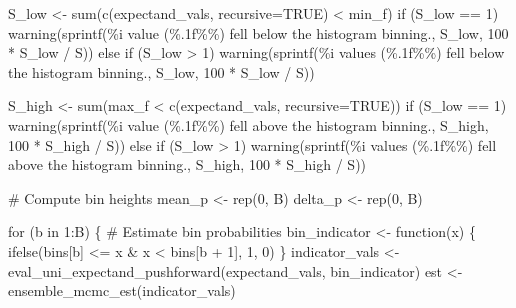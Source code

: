 \documentclass[
  letterpaper,
  DIV=11,
  numbers=noendperiod]{scrartcl}
\newenvironment{Shaded}{\begin{snugshade}}{\end{snugshade}}
\newcommand{\BuiltInTok}[1]{\textcolor[rgb]{0.00,0.23,0.31}{#1}}
\newcommand{\CommentTok}[1]{\textcolor[rgb]{0.37,0.37,0.37}{#1}}
\newcommand{\ControlFlowTok}[1]{\textcolor[rgb]{0.00,0.23,0.31}{#1}}
\newcommand{\DecValTok}[1]{\textcolor[rgb]{0.68,0.00,0.00}{#1}}
\newcommand{\KeywordTok}[1]{\textcolor[rgb]{0.00,0.23,0.31}{#1}}
\newcommand{\NormalTok}[1]{\textcolor[rgb]{0.00,0.23,0.31}{#1}}
\newcommand{\OperatorTok}[1]{\textcolor[rgb]{0.37,0.37,0.37}{#1}}
\newcommand{\SpecialCharTok}[1]{\textcolor[rgb]{0.37,0.37,0.37}{#1}}
\newcommand{\StringTok}[1]{\textcolor[rgb]{0.13,0.47,0.30}{#1}}
\begin{document}
\begin{Shaded}
\begin{Highlighting}[]
\NormalTok{  S\_low }\OperatorTok{\textless{}{-}} \BuiltInTok{sum}\NormalTok{(c(expectand\_vals, recursive}\OperatorTok{=}\NormalTok{TRUE) }\OperatorTok{\textless{}}\NormalTok{ min\_f)}
  \ControlFlowTok{if}\NormalTok{ (S\_low }\OperatorTok{==} \DecValTok{1}\NormalTok{)}
\NormalTok{    warning(sprintf(}\StringTok{\textquotesingle{}}\SpecialCharTok{\%i}\StringTok{ value (}\SpecialCharTok{\%.1f\%\%}\StringTok{) fell below the histogram binning.\textquotesingle{}}\NormalTok{,}
\NormalTok{                    S\_low, }\DecValTok{100} \OperatorTok{*}\NormalTok{ S\_low }\OperatorTok{/}\NormalTok{ S))}
  \ControlFlowTok{else} \ControlFlowTok{if}\NormalTok{ (S\_low }\OperatorTok{\textgreater{}} \DecValTok{1}\NormalTok{)}
\NormalTok{    warning(sprintf(}\StringTok{\textquotesingle{}}\SpecialCharTok{\%i}\StringTok{ values (}\SpecialCharTok{\%.1f\%\%}\StringTok{) fell below the histogram binning.\textquotesingle{}}\NormalTok{,}
\NormalTok{                    S\_low, }\DecValTok{100} \OperatorTok{*}\NormalTok{ S\_low }\OperatorTok{/}\NormalTok{ S))}

\NormalTok{  S\_high }\OperatorTok{\textless{}{-}} \BuiltInTok{sum}\NormalTok{(max\_f }\OperatorTok{\textless{}}\NormalTok{ c(expectand\_vals, recursive}\OperatorTok{=}\NormalTok{TRUE))}
  \ControlFlowTok{if}\NormalTok{ (S\_low }\OperatorTok{==} \DecValTok{1}\NormalTok{)}
\NormalTok{    warning(sprintf(}\StringTok{\textquotesingle{}}\SpecialCharTok{\%i}\StringTok{ value (}\SpecialCharTok{\%.1f\%\%}\StringTok{) fell above the histogram binning.\textquotesingle{}}\NormalTok{,}
\NormalTok{                    S\_high, }\DecValTok{100} \OperatorTok{*}\NormalTok{ S\_high }\OperatorTok{/}\NormalTok{ S))}
  \ControlFlowTok{else} \ControlFlowTok{if}\NormalTok{ (S\_low }\OperatorTok{\textgreater{}} \DecValTok{1}\NormalTok{)}
\NormalTok{    warning(sprintf(}\StringTok{\textquotesingle{}}\SpecialCharTok{\%i}\StringTok{ values (}\SpecialCharTok{\%.1f\%\%}\StringTok{) fell above the histogram binning.\textquotesingle{}}\NormalTok{,}
\NormalTok{                    S\_high, }\DecValTok{100} \OperatorTok{*}\NormalTok{ S\_high }\OperatorTok{/}\NormalTok{ S))}

  \CommentTok{\# Compute bin heights}
\NormalTok{  mean\_p }\OperatorTok{\textless{}{-}}\NormalTok{ rep(}\DecValTok{0}\NormalTok{, B)}
\NormalTok{  delta\_p }\OperatorTok{\textless{}{-}}\NormalTok{ rep(}\DecValTok{0}\NormalTok{, B)}

  \ControlFlowTok{for}\NormalTok{ (b }\KeywordTok{in} \DecValTok{1}\NormalTok{:B) \{}
    \CommentTok{\# Estimate bin probabilities}
\NormalTok{    bin\_indicator }\OperatorTok{\textless{}{-}}\NormalTok{ function(x) \{}
\NormalTok{      ifelse(bins[b] }\OperatorTok{\textless{}=}\NormalTok{ x }\OperatorTok{\&}\NormalTok{ x }\OperatorTok{\textless{}}\NormalTok{ bins[b }\OperatorTok{+} \DecValTok{1}\NormalTok{], }\DecValTok{1}\NormalTok{, }\DecValTok{0}\NormalTok{)}
\NormalTok{    \}}
\NormalTok{    indicator\_vals }\OperatorTok{\textless{}{-}}\NormalTok{ eval\_uni\_expectand\_pushforward(expectand\_vals,}
\NormalTok{                                                     bin\_indicator)}
\NormalTok{    est }\OperatorTok{\textless{}{-}}\NormalTok{ ensemble\_mcmc\_est(indicator\_vals)}


\end{Highlighting}
\end{Shaded}
\end{document}
